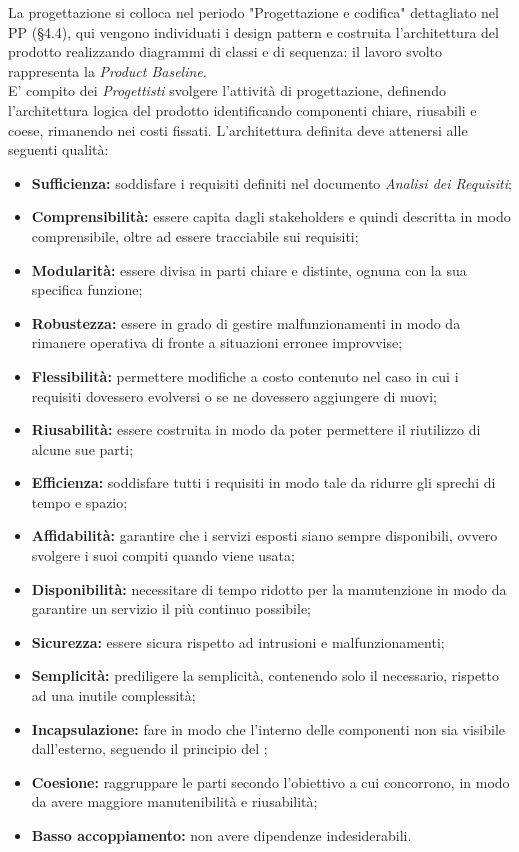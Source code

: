 \documentclass[../NomeDocumento.tex]{subfiles}
\begin{document}
	La progettazione si colloca nel periodo "Progettazione e codifica" dettagliato nel PP (§4.4), qui vengono individuati i design pattern e costruita l'architettura del prodotto realizzando diagrammi di classi e di sequenza: il lavoro svolto rappresenta la \textit{Product Baseline}. \\
	E' compito dei \textit{Progettisti} svolgere l'attività di progettazione, definendo l'architettura logica del prodotto identificando componenti chiare, riusabili e coese, rimanendo nei costi fissati. L'architettura definita deve attenersi alle seguenti qualità:
	\begin{itemize}
		\item \textbf{Sufficienza:} soddisfare i requisiti definiti nel documento \textit{Analisi dei Requisiti};
		\item \textbf{Comprensibilità:} essere capita dagli stakeholders e quindi descritta in modo comprensibile, oltre ad essere tracciabile sui requisiti;
		\item \textbf{Modularità:} essere divisa in parti chiare e distinte, ognuna con la sua specifica funzione;
		\item \textbf{Robustezza:} essere in grado di gestire malfunzionamenti in modo da rimanere operativa di fronte a situazioni erronee improvvise;
		\item \textbf{Flessibilità:} permettere modifiche a costo contenuto nel caso in cui i requisiti dovessero evolversi o se ne dovessero aggiungere di nuovi;
		\item \textbf{Riusabilità:} essere costruita in modo da poter permettere il riutilizzo di alcune sue parti;
		\item \textbf{Efficienza:} soddisfare tutti i requisiti in modo tale da ridurre gli sprechi di tempo e spazio;
		\item \textbf{Affidabilità:} garantire che i servizi esposti siano sempre disponibili, ovvero svolgere i suoi compiti quando viene usata;
		\item \textbf{Disponibilità:} necessitare di tempo ridotto per la manutenzione in modo da garantire un servizio il più continuo possibile;
		\item \textbf{Sicurezza:} essere sicura rispetto ad intrusioni e malfunzionamenti;
		\item \textbf{Semplicità:} prediligere la semplicità, contenendo solo il necessario, rispetto ad una inutile complessità;
		\item \textbf{Incapsulazione:} fare in modo che l'interno delle componenti non sia visibile dall'esterno, seguendo il principio del ;
		\item \textbf{Coesione:} raggruppare le parti secondo l'obiettivo a cui concorrono, in modo da avere maggiore manutenibilità e riusabilità;
		\item \textbf{Basso accoppiamento:} non avere dipendenze indesiderabili.
	\end{itemize}
	
\end{document}
